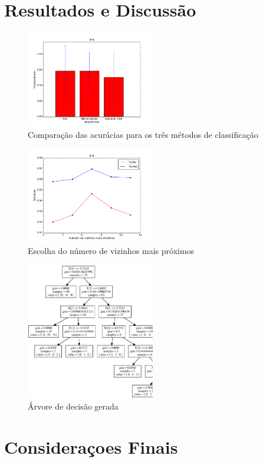 \documentclass[12pt, a4paper, brazil]{article}
\begin{document}
\section{Resultados e Discussão}

\begin{figure}[!htb]
  \caption{Comparação das acurácias para os três métodos de classificação}
  \centering
    \includegraphics[width=0.5\textwidth]{Iris/acuracias.png}
\end{figure}

\begin{figure}[!htb]
  \caption{Escolha do número de vizinhos mais próximos}
  \centering
    \includegraphics[width=0.5\textwidth]{Iris/knn.png}
\end{figure}

\begin{figure}[!htb]
  \caption{Árvore de decisão gerada}
  \centering
    \includegraphics[width=0.5\textwidth]{Iris/arvore.eps}
\end{figure}

\section{Consideraçoes Finais}

\newpage

\end{document}
